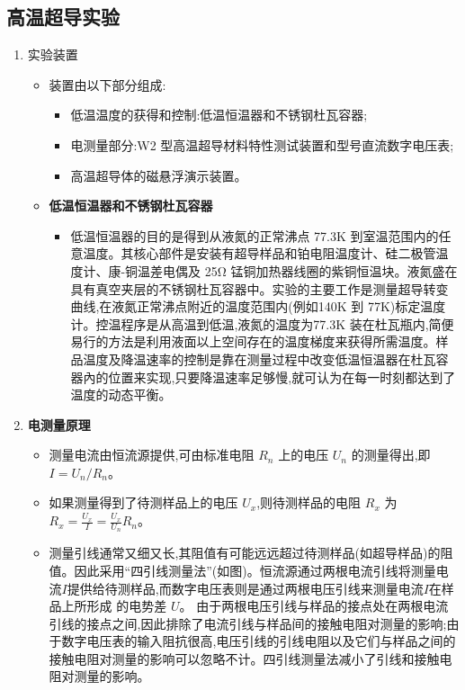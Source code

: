 \documentclass[12pt, a4paper]{article}
\begin{document}
\subsection{高温超导实验}
\begin{enumerate}
    \item 实验装置
    \begin{itemize}
        \item 装置由以下部分组成:
    \begin{itemize}
        \item 低温温度的获得和控制:低温恒温器和不锈钢杜瓦容器;
        \item 电测量部分:W2 型高温超导材料特性测试装置和型号直流数字电压表;
        \item 高温超导体的磁悬浮演示装置。
      \end{itemize}
     \item \textbf{低温恒温器和不锈钢杜瓦容器}
       \begin{itemize}
       \item 低温恒温器的目的是得到从液氮的正常沸点 77.3K 到室温范围内的任意温度。其核心部件是安装有超导样品和铂电阻温度计、硅二极管温度计、康-铜温差电偶及 25Ω 锰铜加热器线圈的紫铜恒温块。液氮盛在具有真空夹层的不锈钢杜瓦容器中。实验的主要工作是测量超导转变曲线,在液氮正常沸点附近的温度范围内(例如140K 到 77K)标定温度计。控温程序是从高温到低温,液氮的温度为77.3K 装在杜瓦瓶内,简便易行的方法是利用液面以上空间存在的温度梯度来获得所需温度。样品温度及降温速率的控制是靠在测量过程中改变低温恒温器在杜瓦容器內的位置来实现,只要降温速率足够慢,就可认为在每一时刻都达到了温度的动态平衡。
        \end{itemize}
    \end{itemize}
    \item \textbf{电测量原理}
       \begin{itemize}
          \item 测量电流由恒流源提供,可由标准电阻 $R_n$ 上的电压 $U_n$ 的测量得出,即 $I=U_n/R_n$。
            \item 如果测量得到了待测样品上的电压 $U_x$,则待测样品的电阻 $R_x$ 为 $R_x = \frac{U_x}{I} = \frac{U_x}{U_n}R_n$。
          \item 测量引线通常又细又长,其阻值有可能远远超过待测样品(如超导样品)的阻值。因此采用“四引线测量法”(如图)。恒流源通过两根电流引线将测量电流$I$提供给待测样品,而数字电压表则是通过两根电压引线来测量电流$I$在样品上所形成 的电势差 $U$。 由于两根电压引线与样品的接点处在两根电流引线的接点之间,因此排除了电流引线与样品间的接触电阻对测量的影响;由于数字电压表的输入阻抗很高,电压引线的引线电阻以及它们与样品之间的接触电阻对测量的影响可以忽略不计。四引线测量法减小了引线和接触电阻对测量的影响。

\end{itemize}
\end{enumerate}
\end{document}
